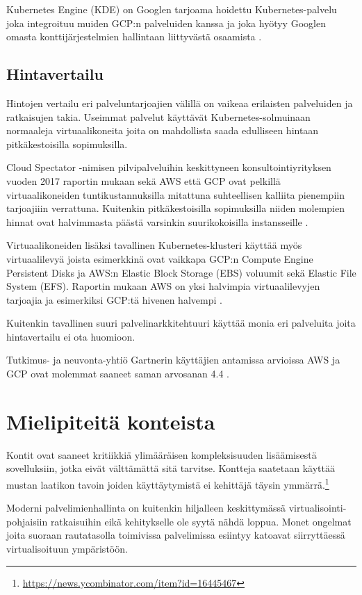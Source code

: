 \documentclass[finnish]{tktltiki2}
\theoremstyle{definition}
\theoremstyle{remark}
\begin{document}
Kubernetes Engine (KDE) on Googlen tarjoama hoidettu Kubernetes-palvelu joka integroituu muiden GCP:n palveluiden kanssa ja joka hyötyy Googlen omasta konttijärjestelmien hallintaan liittyvästä osaamista \cite{kde-docs}.

\subsection{Hintavertailu}

Hintojen vertailu eri palveluntarjoajien välillä on vaikeaa erilaisten palveluiden ja ratkaisujen takia. Useimmat palvelut käyttävät Kubernetes-solmuinaan normaaleja virtuaalikoneita joita on mahdollista saada edulliseen hintaan pitkäkestoisilla sopimuksilla.

Cloud Spectator -nimisen pilvipalveluihin keskittyneen konsultointiyrityksen vuoden 2017 raportin mukaan sekä AWS että GCP ovat pelkillä virtuaalikoneiden tuntikustannuksilla mitattuna suhteellisen kalliita pienempiin tarjoajiiin verrattuna. Kuitenkin pitkäkestoisilla sopimuksilla niiden molempien hinnat ovat halvimmasta päästä varsinkin suurikokoisilla instansseille \cite{cloud-price-comparison}.

Virtuaalikoneiden lisäksi tavallinen Kubernetes-klusteri käyttää myös virtuaalilevyä joista esimerkkinä ovat vaikkapa GCP:n Compute Engine Persistent Disks ja AWS:n Elastic Block Storage (EBS) voluumit sekä Elastic File System (EFS). Raportin mukaan AWS on yksi halvimpia virtuaalilevyjen tarjoajia ja esimerkiksi GCP:tä hivenen halvempi \cite{cloud-price-comparison}.

Kuitenkin tavallinen suuri palvelinarkkitehtuuri käyttää monia eri palveluita joita hintavertailu ei ota huomioon.

Tutkimus- ja neuvonta-yhtiö Gartnerin käyttäjien antamissa arvioissa AWS ja GCP ovat molemmat saaneet saman arvosanan 4.4 \cite{gartner-aws-gcp}.

\section{Mielipiteitä konteista}

Kontit ovat saaneet kritiikkiä ylimääräisen kompleksisuuden lisäämisestä sovelluksiin, jotka eivät välttämättä sitä tarvitse. Kontteja saatetaan käyttää mustan laatikon tavoin joiden käyttäytymistä ei kehittäjä täysin ymmärrä.\footnote{\url{https://news.ycombinator.com/item?id=16445467}}

Moderni palvelimienhallinta on kuitenkin hiljalleen keskittymässä virtualisointi-pohjaisiin ratkaisuihin eikä kehitykselle ole syytä nähdä loppua. Monet ongelmat joita suoraan rautatasolla toimivissa palvelimissa esiintyy katoavat siirryttäessä virtualisoituun ympäristöön. 
\end{document}
